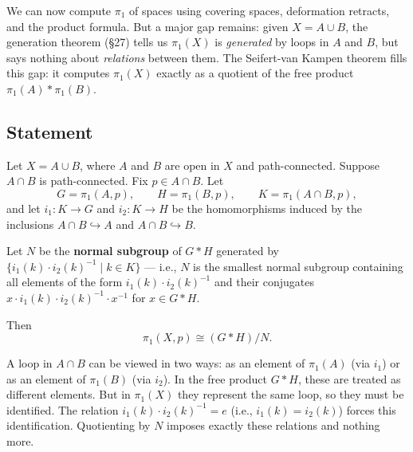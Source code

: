 \documentclass[11pt]{report}
\begin{document}
\begin{rembox}[Motivation]
We can now compute $\pi_1$ of spaces using covering spaces, deformation retracts, and the product formula. But a major gap remains: given $X = A \cup B$, the generation theorem (\S 27) tells us $\pi_1(X)$ is \emph{generated} by loops in $A$ and $B$, but says nothing about \emph{relations} between them. The Seifert-van Kampen theorem fills this gap: it computes $\pi_1(X)$ exactly as a quotient of the free product $\pi_1(A) * \pi_1(B)$.
\end{rembox}

\subsection{Statement}

\begin{thmbox}
Let $X = A \cup B$, where $A$ and $B$ are open in $X$ and path-connected. Suppose $A \cap B$ is path-connected. Fix $p \in A \cap B$. Let
\[G = \pi_1(A, p), \qquad H = \pi_1(B, p), \qquad K = \pi_1(A \cap B, p),\]
and let $i_1: K \to G$ and $i_2: K \to H$ be the homomorphisms induced by the inclusions $A \cap B \hookrightarrow A$ and $A \cap B \hookrightarrow B$.

Let $N$ be the \textbf{normal subgroup} of $G * H$ generated by $\{i_1(k) \cdot i_2(k)^{-1} \mid k \in K\}$ --- i.e., $N$ is the smallest normal subgroup containing all elements of the form $i_1(k) \cdot i_2(k)^{-1}$ and their conjugates $x \cdot i_1(k) \cdot i_2(k)^{-1} \cdot x^{-1}$ for $x \in G * H$.

Then
\[\pi_1(X, p) \cong (G * H) / N.\]
\end{thmbox}

\begin{rembox}
A loop in $A \cap B$ can be viewed in two ways: as an element of $\pi_1(A)$ (via $i_1$) or as an element of $\pi_1(B)$ (via $i_2$). In the free product $G * H$, these are treated as different elements. But in $\pi_1(X)$ they represent the same loop, so they must be identified. The relation $i_1(k) \cdot i_2(k)^{-1} = e$ (i.e., $i_1(k) = i_2(k)$) forces this identification. Quotienting by $N$ imposes exactly these relations and nothing more.
\end{rembox}
\end{document}
